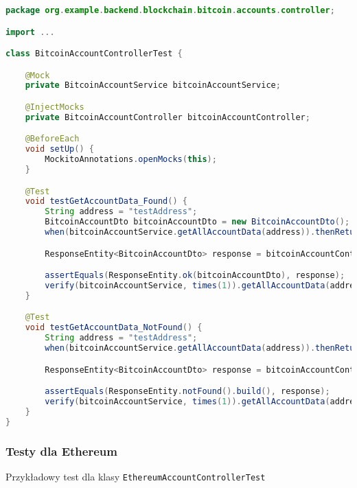 \begin{lstlisting}[language=Java, style=JavaStyle]
package org.example.backend.blockchain.bitcoin.accounts.controller;

import ...

class BitcoinAccountControllerTest {

    @Mock
    private BitcoinAccountService bitcoinAccountService;

    @InjectMocks
    private BitcoinAccountController bitcoinAccountController;

    @BeforeEach
    void setUp() {
        MockitoAnnotations.openMocks(this);
    }

    @Test
    void testGetAccountData_Found() {
        String address = "testAddress";
        BitcoinAccountDto bitcoinAccountDto = new BitcoinAccountDto();
        when(bitcoinAccountService.getAllAccountData(address)).thenReturn(bitcoinAccountDto);

        ResponseEntity<BitcoinAccountDto> response = bitcoinAccountController.getAccountData(address);

        assertEquals(ResponseEntity.ok(bitcoinAccountDto), response);
        verify(bitcoinAccountService, times(1)).getAllAccountData(address);
    }

    @Test
    void testGetAccountData_NotFound() {
        String address = "testAddress";
        when(bitcoinAccountService.getAllAccountData(address)).thenReturn(null);

        ResponseEntity<BitcoinAccountDto> response = bitcoinAccountController.getAccountData(address);

        assertEquals(ResponseEntity.notFound().build(), response);
        verify(bitcoinAccountService, times(1)).getAllAccountData(address);
    }
}
\end{lstlisting}

\subsubsection{Testy dla Ethereum}
Przykładowy test dla klasy \texttt{EthereumAccountControllerTest}

